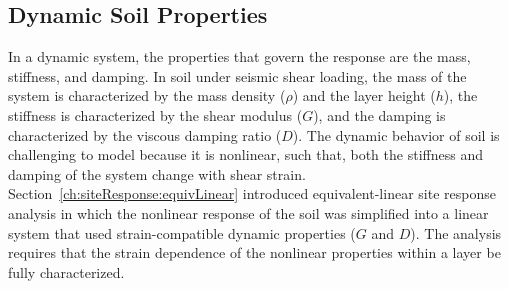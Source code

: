 \documentclass[11pt]{report}
\begin{document}
% 

\subsection{Dynamic Soil Properties}\label{ch:siteResponse:dynprops}
In a dynamic system,  the properties that govern the response are the mass, stiffness, and damping.
In soil under seismic shear loading, the mass of the system is characterized by the mass density
($\rho$) and the layer height ($h$), the stiffness is characterized by the shear modulus ($G$), and
the damping is characterized by the viscous damping ratio ($D$).  The dynamic behavior of soil is
challenging to model because it is nonlinear, such that, both the stiffness and damping of the
system change with shear strain.  Section~\ref{ch:siteResponse:equivLinear} introduced
equivalent-linear site response analysis in which the nonlinear response of the soil was simplified
into a linear system that used strain-compatible dynamic properties ($G$ and $D$).  The analysis
requires that the strain dependence of the nonlinear properties within a layer be fully
characterized.
\end{document}

